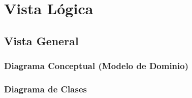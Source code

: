 \section{Vista Lógica} \label{vistaLogica}
    \subsection{Vista General}
    \subsubsection{Diagrama Conceptual (Modelo de Dominio)}
    \subsubsection{Diagrama de Clases}